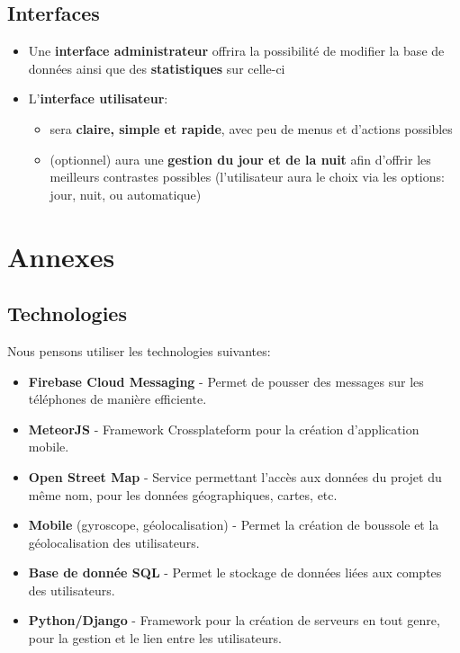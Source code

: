 \documentclass[french]{article}
\begin{document}
		\subsection{Interfaces}
			\begin{itemize}
				\item Une \textbf{interface administrateur} offrira la possibilité de modifier la base de données ainsi que des \textbf{statistiques} sur celle-ci
				\item L'\textbf{interface utilisateur}:
				\begin{itemize}
					\item sera \textbf{claire, simple et rapide}, avec peu de menus et d'actions possibles
					\item (optionnel) aura une \textbf{gestion du jour et de la nuit} afin d'offrir les meilleurs contrastes possibles (l'utilisateur aura le choix via les options: jour, nuit, ou automatique)
				\end{itemize}
			\end{itemize}
		
	\section{Annexes}
		\subsection{Technologies}
		\label{subsec:technologies}
			Nous pensons utiliser les technologies suivantes:
			\begin{itemize}
				\item \textbf{Firebase Cloud Messaging} - Permet de pousser des messages sur les téléphones de manière efficiente.
				\item \textbf{MeteorJS} - Framework Crossplateform pour la création d'application mobile.
				\item \textbf{Open Street Map} - Service permettant l'accès aux données du projet du même nom, pour les données géographiques, cartes, etc.
				\item \textbf{Mobile} (gyroscope, géolocalisation) - Permet la création de boussole et la géolocalisation des utilisateurs.
				\item \textbf{Base de donnée SQL} - Permet le stockage de données liées aux comptes des utilisateurs.
				\item \textbf{Python/Django} - Framework pour la création de serveurs en tout genre, pour la gestion et le lien entre les utilisateurs. \\
			\end{itemize}
		
\end{document}
